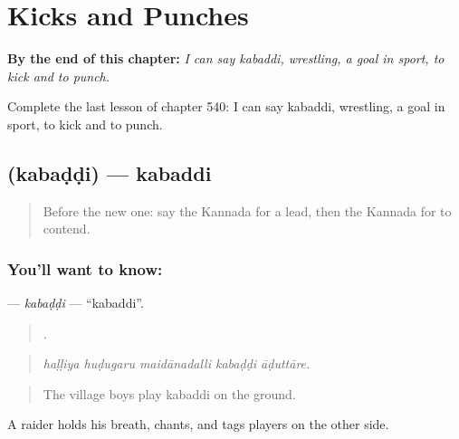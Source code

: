 
\chapter{Kicks and Punches}
\label{ch:ka-kicks-and-punches}

\begin{chapteropening}
\textbf{By the end of this chapter:} \emph{I can say kabaddi, wrestling, a goal in sport, to kick and to punch.}

Complete the last lesson of chapter 540: I can say kabaddi, wrestling, a goal in sport, to kick and to punch.
\end{chapteropening}

\section[\texorpdfstring{\kn{ಕಬಡ್ಡಿ} (kabaḍḍi)}{ಕಬಡ್ಡಿ (kabaḍḍi)}]{ (kabaḍḍi) — kabaddi}

\label{lesson:KA-C540-kabaddi}



\begin{quote}
Before the new one: say the Kannada for a lead, then the Kannada for to contend.
\end{quote}

\subsection*{You'll want to know: }
\textbf{} — \emph{kabaḍḍi} — \textquotedblleft{}kabaddi\textquotedblright{}.

\begin{quote}
    .
\end{quote}

\begin{quote}
\emph{haḷḷiya huḍugaru maidānadalli kabaḍḍi āḍuttāre.}
\end{quote}

\begin{quote}
The village boys play kabaddi on the ground.
\end{quote}

A raider holds his breath, chants, and tags players on the other side.

